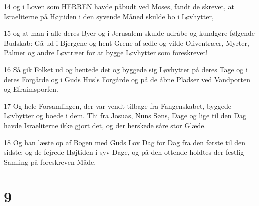 \par 14 og i Loven som HERREN havde påbudt ved Moses, fandt de skrevet, at Israeliterne på Højtiden i den syvende Måned skulde bo i Løvhytter,
\par 15 og at man i alle deres Byer og i Jerusalem skulde udråbe og kundgøre følgende Budskab: Gå ud i Bjergene og hent Grene af ædle og vilde Oliventræer, Myrter, Palmer og andre Løvtræer for at bygge Løvhytter som foreskrevet!
\par 16 Så gik Folket ud og hentede det og byggede sig Løvhytter på deres Tage og i deres Forgårde og i Guds Hus's Forgårde og på de åbne Pladser ved Vandporten og Efraimsporfen.
\par 17 Og hele Forsamlingen, der var vendt tilbage fra Fangenskabet, byggede Løvbytter og boede i dem. Thi fra Josuas, Nuns Søns, Dage og lige til den Dag havde Israeliterne ikke gjort det, og der herskede såre stor Glæde.
\par 18 Og han læste op af Bogen med Guds Lov Dag for Dag fra den første til den sidste; og de fejrede Højtiden i syv Dage, og på den ottende holdtes der festlig Samling på foreskreven Måde.

\chapter{9}

